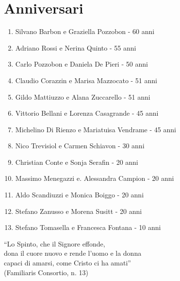 \section{Anniversari}

\begin{enumerate}
  \item Silvano Barbon e Graziella Pozzobon - 60 anni
  \item Adriano Rossi e Nerina Quinto - 55 anni
  \item Carlo Pozzobon e Daniela De Pieri - 50 anni
  \item Claudio Corazzin e Marisa Mazzocato - 51 anni
  \item Gildo Mattiuzzo e Alana Zuccarello - 51 anni
  \item Vittorio Bellani e Lorenza Casagrande - 45 anni
  \item Michelino Di Rienzo e Mariatuisa Vendrame - 45 anni
  \item Nico Trevisiol e Carmen Schiavon - 30 anni
  \item Christian Conte e Sonja Serafin - 20 anni
  \item Massimo Menegazzi e. Alessandra Campion - 20 anni
  \item Aldo Scandiuzzi e Monica Boiggo - 20 anni
  \item Stefano Zanusso e Morena Susitt - 20 anni
  \item Stefano Tomasella e Francesca Fontana - 10 anni
\end{enumerate}

“Lo Spinto, che il Signore effonde,\\
dona il cuore nuovo e rende l’uomo e la donna\\
capaci di amarsi, come Cristo ci ha amati”\\
(Familiaris Consortio, n. 13)
